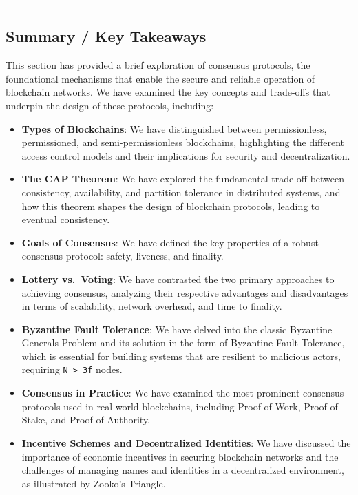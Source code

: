 \begin{center}\rule{0.5\linewidth}{0.5pt}\end{center}

\subsection{Summary / Key Takeaways}\label{summary-key-takeaways}

This section has provided a brief exploration of consensus
protocols, the foundational mechanisms that enable the secure and
reliable operation of blockchain networks. We have examined the key
concepts and trade-offs that underpin the design of these protocols,
including:

\begin{itemize}
	\tightlist
	\item
	\textbf{Types of Blockchains}: We have distinguished between
	permissionless, permissioned, and semi-permissionless blockchains,
	highlighting the different access control models and their
	implications for security and decentralization.
	\item
	\textbf{The CAP Theorem}: We have explored the fundamental trade-off
	between consistency, availability, and partition tolerance in
	distributed systems, and how this theorem shapes the design of
	blockchain protocols, leading to eventual consistency.
	\item
	\textbf{Goals of Consensus}: We have defined the key properties of a
	robust consensus protocol: safety, liveness, and finality.
	\item
	\textbf{Lottery vs.~Voting}: We have contrasted the two primary
	approaches to achieving consensus, analyzing their respective
	advantages and disadvantages in terms of scalability, network
	overhead, and time to finality.
	\item
	\textbf{Byzantine Fault Tolerance}: We have delved into the classic
	Byzantine Generals Problem and its solution in the form of Byzantine
	Fault Tolerance, which is essential for building systems that are
	resilient to malicious actors, requiring
	\texttt{N\ \textgreater{}\ 3f} nodes.
	\item
	\textbf{Consensus in Practice}: We have examined the most prominent
	consensus protocols used in real-world blockchains, including
	Proof-of-Work, Proof-of-Stake, and Proof-of-Authority.
	\item
	\textbf{Incentive Schemes and Decentralized Identities}: We have
	discussed the importance of economic incentives in securing blockchain
	networks and the challenges of managing names and identities in a
	decentralized environment, as illustrated by Zooko's Triangle.
\end{itemize}

